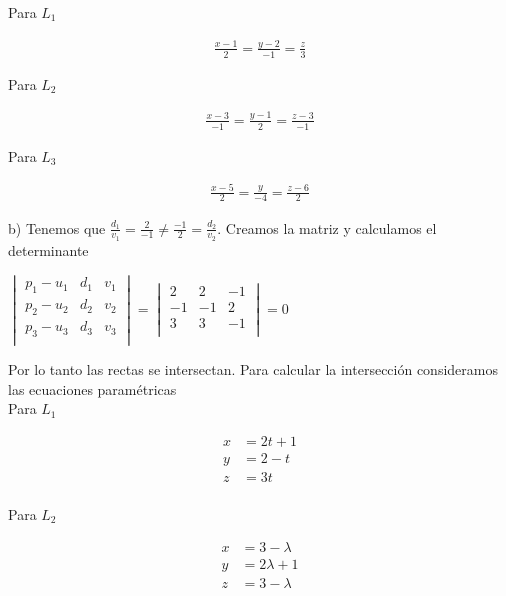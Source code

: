 \documentclass{article}
\theoremstyle{definition}
\begin{document}
Para $L_1$

\begin{align*}
    \frac{x-1}{2} = \frac{y-2}{-1} = \frac{z}{3}
\end{align*}

Para $L_2$

\begin{align*}
    \frac{x-3}{-1} = \frac{y-1}{2} = \frac{z-3}{-1}
\end{align*}

Para $L_3$

\begin{align*}
    \frac{x-5}{2} = \frac{y}{-4} = \frac{z-6}{2}
\end{align*}


b) Tenemos que $\displaystyle \frac{d_1}{v_1} = \frac{2}{-1}\neq \frac{-1}{2} = \frac{d_2}{v_2}$. Creamos la matriz y calculamos el determinante 

\begin{center}
$\displaystyle \begin{vmatrix}
p_1-u_1 & d_1 & v_1 \\
p_2-u_2 & d_2 & v_2 \\
p_3-u_3 & d_3 & v_3 \\
\end{vmatrix} = \displaystyle \begin{vmatrix}
2 & 2 & -1 \\
-1 & -1 & 2 \\
3 & 3 & -1 \\
\end{vmatrix} = 0$
\end{center}


Por lo tanto las rectas se intersectan. Para calcular la intersección consideramos las ecuaciones paramétricas \\

Para $L_1$

\begin{align*}
    x &= 2t+1 \\
    y &= 2-t \\
    z &= 3t \\
\end{align*}

Para $L_2$

\begin{align*}
    x &= 3-\lambda \\
    y &= 2\lambda+1 \\
    z &= 3-\lambda \\
\end{align*}
\end{document}
